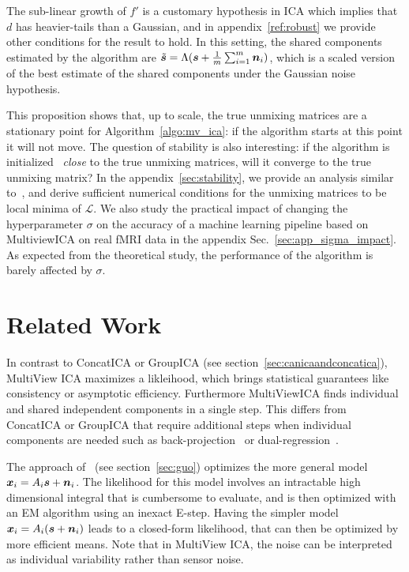 %
The sub-linear growth of $f'$ is a customary hypothesis in ICA which implies that $d$ has heavier-tails than a Gaussian, and in appendix~\ref{ref:robust} we provide other conditions for the result to hold.
%
In this setting, the shared components estimated by the algorithm are $\tilde{\boldsymbol{s}} = \Lambda (\boldsymbol{s} + \frac1m \sum_{i=1}^m \boldsymbol{n}_i)$, which is a scaled version of the best estimate of the shared components under the Gaussian noise hypothesis.

This proposition shows that, up to scale, the true unmixing matrices are a stationary point for Algorithm~\ref{algo:mv_ica}: if the algorithm starts at this point it will not move.
%
The question of stability is also interesting: if the algorithm is initialized ~\emph{close} to the true unmixing matrices, will it converge to the true unmixing matrix?
%
In the appendix~\ref{sec:stability}, we provide an analysis similar to~\cite{cardoso1998blind}, and derive sufficient numerical conditions for the unmixing matrices to be local minima of $\mathcal{L}$.
%
We also study the practical impact of changing the hyperparameter $\sigma$ on the accuracy of a machine learning pipeline based on MultiviewICA on real fMRI data in the appendix Sec.~\ref{sec:app_sigma_impact}.
%
As expected from the theoretical study, the performance of the algorithm is barely affected by $\sigma$.

\section{Related Work}
In contrast to ConcatICA or GroupICA (see section~\ref{sec:canicaandconcatica}),
MultiView ICA maximizes a likleihood, which brings statistical guarantees like
consistency or asymptotic efficiency. Furthermore MultiViewICA finds individual
and shared independent components in a single step. This differs from ConcatICA or
GroupICA that require additional steps when individual components are needed
such as back-projection~\cite{calhoun2001method} or dual-regression~\cite{beckmann2009group}.

The approach of~\cite{guo2008unified} (see section~\ref{sec:guo}) optimizes the more
general model $\boldsymbol{x}_i = A_i\boldsymbol{s} + \boldsymbol{n}_i$. 
The likelihood for this model involves an intractable high dimensional integral
that is cumbersome to evaluate, and is then optimized with an EM algorithm using
an inexact E-step.
Having the simpler model $\boldsymbol{x}_i = A_i(\boldsymbol{s} + \boldsymbol{n}_i)$ leads to a closed-form likelihood,
that can then be optimized by more efficient means.
Note that in MultiView ICA, the noise can be interpreted as individual variability rather than sensor noise. %


